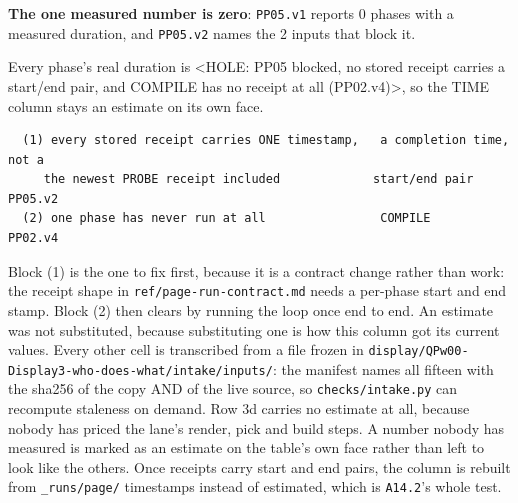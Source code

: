 \textbf{The one measured number is zero}: \texttt{PP05.v1} reports 0 phases with a measured duration, and \texttt{PP05.v2} names the 2 inputs that block it.

Every phase's real duration is <HOLE: PP05 blocked, no stored receipt carries a start/end pair, and COMPILE has no receipt at all (PP02.v4)>, so the TIME column stays an estimate on its own face.

\begin{verbatim}
  (1) every stored receipt carries ONE timestamp,   a completion time, not a
     the newest PROBE receipt included             start/end pair     PP05.v2
  (2) one phase has never run at all                COMPILE            PP02.v4
\end{verbatim}
Block (1) is the one to fix first, because it is a contract change rather than work: the receipt shape in \texttt{ref/page-run-contract.md} needs a per-phase start and end stamp. Block (2) then clears by running the loop once end to end. An estimate was not substituted, because substituting one is how this column got its current values. Every other cell is transcribed from a file frozen in \texttt{display/QPw00-Display3-who-does-what/intake/inputs/}: the manifest names all fifteen with the sha256 of the copy AND of the live source, so \texttt{checks/intake.py} can recompute staleness on demand. Row 3d carries no estimate at all, because nobody has priced the lane's render, pick and build steps. A number nobody has measured is marked as an estimate on the table's own face rather than left to look like the others. Once receipts carry start and end pairs, the column is rebuilt from \texttt{\_runs/page/} timestamps instead of estimated, which is \texttt{A14.2}'s whole test.

